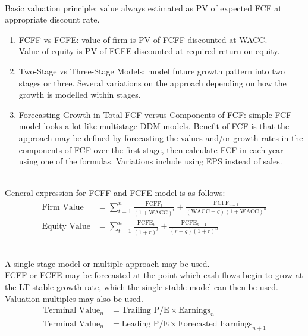 \begin{remark} \\
Basic valuation principle: value always estimated as PV of expected FCF at appropriate discount rate.
\begin{enumerate}[label=\roman*.]
\setlength{\itemsep}{0pt}
\item FCFF vs FCFE: value of firm is PV of FCFF discounted at WACC.\\
Value of equity is PV of FCFE discounted at required return on equity.
\item Two-Stage vs Three-Stage Models: model future growth pattern into two stages or three. Several variations on the approach depending on how the growth is modelled within stages.
\item Forecasting Growth in Total FCF versus Components of FCF: simple FCF model looks a lot like multistage DDM models. Benefit of FCF is that the approach may be defined by forecasting the values and/or growth rates in the components of FCF over the first stage, then calculate FCF in each year using one of the formulas. Variations include using EPS instead of sales.
\end{enumerate}
\end{remark}

\begin{method} \\
General expression for FCFF and FCFE model is as follows: 
\begin{align}
\text{Firm Value} &= \sum\limits_{t=1}^n \frac{\text{FCFF}_t}{(1+\text{WACC})^t} + \frac{\text{FCFF}_{n+1}}{(\text{WACC} - g)(1+\text{WACC})^n} \nonumber \\
\text{Equity Value} &= \sum\limits_{t=1}^n \frac{\text{FCFE}_t}{(1+r)^t} + \frac{\text{FCFE}_{n+1}}{(r - g)(1+r)^n} \nonumber
\end{align}
\end{method}

\begin{method} \\
A single-stage model or multiple approach may be used.\\
FCFF or FCFE may be forecasted at the point which cash flows begin to grow at the LT stable growth rate, which the single-stable model can then be used.\\
Valuation multiples may also be used.
\begin{align}
\text{Terminal Value}_n &= \text{Trailing P/E} \times \text{Earnings}_n \nonumber \\
\text{Terminal Value}_n &= \text{Leading P/E} \times \text{Forecasted Earnings}_{n+1} \nonumber
\end{align}
\end{method}